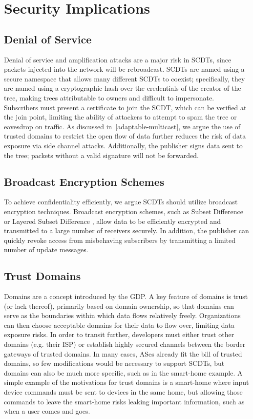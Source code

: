 \section{Security Implications}
\subsection{Denial of Service}
\label{denial-of-service}
Denial of service and amplification attacks are a major risk in SCDTs, since packets injected into the network will be rebroadcast.  SCDTs are named using a secure namespace that allows many different SCDTs to coexist; specifically, they are named using a cryptographic hash over the credentials of the creator of the tree, making trees attributable to owners and difficult to impersonate.  Subscribers must present a certificate to join the SCDT, which can be verified at the join point, limiting the ability of attackers to attempt to spam the tree or eavesdrop on traffic.  As discussed in~\autoref{adaptable-multicast}, we argue the use of trusted domains to restrict the open flow of data further reduces the risk of data exposure via side channel attacks.  Additionally, the publisher signs data sent to the tree; packets without a valid signature will not be forwarded.  

\subsection{Broadcast Encryption Schemes}
\label{encryption-security}

To achieve confidentiality efficiently, we argue SCDTs should utilize broadcast encryption techniques.  Broadcast encryption \cite{broadcastenc} schemes, such as Subset Difference \cite{subset} or Layered Subset Difference \cite{lsd}, allow data to be efficiently encrypted and transmitted to a large number of receivers securely.  In addition, the publisher can quickly revoke access from misbehaving subscribers by transmitting a limited number of update messages.

\subsection{Trust Domains}
\label{domains}

Domains are a concept introduced by the GDP. A key feature of domains is trust (or lack thereof), primarily based
on domain ownership, so that domains can serve as the boundaries within which
data flows relatively freely.  Organizations can then choose acceptable
domains for their data to flow over, limiting data exposure risks. In order to transit further, developers must either trust other domains (e.g. their ISP) or establish highly secured channels between the border gateways of trusted domains. In many cases, ASes already fit the bill of trusted domains, so few modifications would be necessary to support SCDTs, but domains can also be much more specific, such as in the smart-home example. A simple example of the motivations for trust domains is a smart-home where input device commands must be sent to devices in the same home, but allowing those commands to leave the smart-home risks leaking important information, such as when a user comes and goes.  

